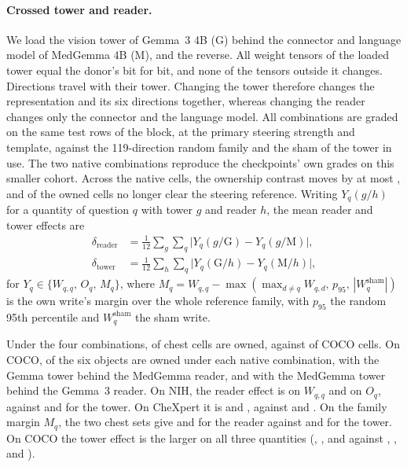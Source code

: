\documentclass[11pt]{article}
\begin{document}
\paragraph{Crossed tower and reader.} We load the vision tower of Gemma~3 4B (G) behind the connector and language model of MedGemma 4B (M), and the reverse. All \cfSwapTensors{} weight tensors of the loaded tower equal the donor's bit for bit, and none of the \cfSwapOutside{} tensors outside it changes. Directions travel with their tower. Changing the tower therefore changes the representation and its six directions together, whereas changing the reader changes only the connector and the language model. All \cfSwapCombos{} combinations are graded on the same \cfSwapRows{} test rows of the block, at the primary steering strength and template, against the 119-direction random family and the sham of the tower in use. The two native combinations reproduce the checkpoints' own grades on this smaller cohort. Across the \cfSwapNativeCells{} native cells, the ownership contrast moves by at most \cfSwapNativeMaxDO{}, and \cfSwapNativeLostReference{} of the \cfSwapNativeOwnedFull{} owned cells no longer clear the steering reference. Writing $Y_q(g/h)$ for a quantity of question $q$ with tower $g$ and reader $h$, the mean reader and tower effects are
\begin{equation}
\begin{aligned}
\delta_{\text{reader}}&=\frac{1}{12}\sum_{g}\sum_{q}\bigl|Y_q(g/\mathrm G)-Y_q(g/\mathrm M)\bigr|,\\
\delta_{\text{tower}}&=\frac{1}{12}\sum_{h}\sum_{q}\bigl|Y_q(\mathrm G/h)-Y_q(\mathrm M/h)\bigr|,
\end{aligned}
\label{eq:crossover}
\end{equation}
for $Y_q\in\{W_{q,q},\,O_q,\,M_q\}$, where $M_q=W_{q,q}-\max(\max_{d\neq q}W_{q,d},\,p_{95},\,|W^{\mathrm{sham}}_q|)$ is the own write's margin over the whole reference family, with $p_{95}$ the random 95th percentile and $W^{\mathrm{sham}}_q$ the sham write.

Under the four combinations, \cfSwapChestOwned{} of \cfSwapChestCells{} chest cells are owned, against \cfSwapCocoOwned{} of \cfSwapCocoCells{} COCO cells. On COCO, \cfSwapCocoNativeMin{} of the six objects are owned under each native combination, \cfSwapCocoGemmaTowerCross{} with the Gemma tower behind the MedGemma reader, and \cfSwapCocoMedTowerCross{} with the MedGemma tower behind the Gemma~3 reader. On NIH, the reader effect is \cfSwapReaderNihMin{} on $W_{q,q}$ and \cfSwapReaderNihOMin{} on $O_q$, against \cfSwapTowerNihMin{} and \cfSwapTowerNihOMin{} for the tower. On CheXpert it is \cfSwapReaderChexMin{} and \cfSwapReaderChexOMin{}, against \cfSwapTowerChexMin{} and \cfSwapTowerChexOMin{}. On the family margin $M_q$, the two chest sets give \cfSwapReaderNihMMin{} and \cfSwapReaderChexMMin{} for the reader against \cfSwapTowerNihMMin{} and \cfSwapTowerChexMMin{} for the tower. On COCO the tower effect is the larger on all three quantities (\cfSwapTowerCocoMin{}, \cfSwapTowerCocoOMin{}, and \cfSwapTowerCocoMMin{} against \cfSwapReaderCocoMin{}, \cfSwapReaderCocoOMin{}, and \cfSwapReaderCocoMMin{}).
\end{document}
